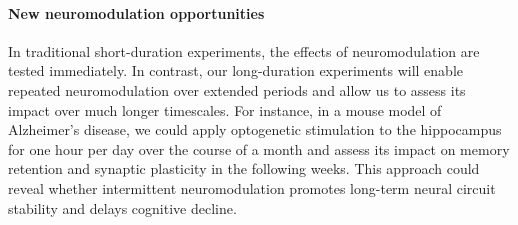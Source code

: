 \paragraph{New neuromodulation opportunities}
%
In traditional short-duration experiments, the effects of neuromodulation are
tested immediately. In contrast, our long-duration experiments will enable
repeated neuromodulation over extended periods and allow us to assess its
impact over much longer timescales.
%
For instance, in a mouse model of Alzheimer's disease, we could apply
optogenetic stimulation to the hippocampus for one hour per day over the course
of a month and assess its impact on memory retention and synaptic plasticity in
the following weeks. This approach could reveal whether intermittent
neuromodulation promotes long-term neural circuit stability and delays
cognitive decline.

